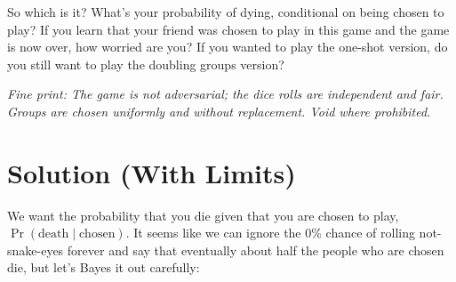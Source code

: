 \documentclass[article,twocolumn]{memoir}
\begin{document}
So which is it? 
What's your probability of dying, conditional on being chosen to play?
If you learn that your friend was chosen to play in this game and the game is now over, how worried are you?
If you wanted to play the one-shot version, do you still want to play the doubling groups version?

\vspace{1em}

\emph{Fine print: 
The game is not adversarial; the dice rolls are independent and fair.
Groups are chosen uniformly and without replacement.
Void where prohibited.
}

\newpage

\chapter{Solution (With Limits)}

We want the probability that you die given that you are chosen to play, 
$\Pr(\text{death}\mid\text{chosen})$.
It seems like we can ignore the 0\% chance of rolling not-snake-eyes forever and say that eventually about half the people who are chosen die, but let's Bayes it out carefully:
\end{document}

